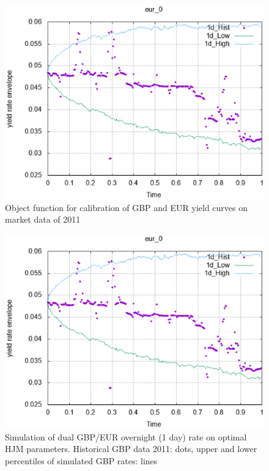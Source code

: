 \documentclass[10pt]{article}
\begin{document}
\begin{figure}[H]
\centering
\includegraphics [width=1\textwidth]{blank.eps}
\caption{Object function for calibration of GBP and EUR yield curves on market data of 2011}
\label{Q1d}
\end{figure}


\begin{figure}[H]
\centering
\includegraphics [width=1\textwidth]{blank.eps}
\caption{Simulation of dual GBP/EUR overnight (1 day) rate on optimal HJM parameters. Historical GBP data 2011: dots, upper and lower percentiles of simulated GBP rates: lines}
\label{gbp0d}
\end{figure}
\end{document}
